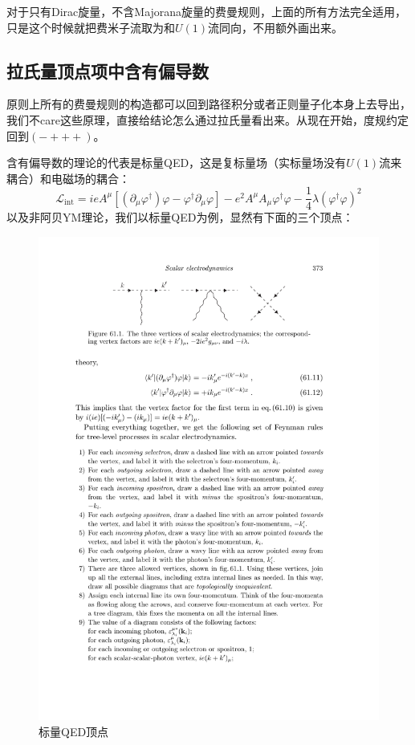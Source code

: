 对于只有Dirac旋量，不含Majorana旋量的费曼规则，上面的所有方法完全适用，只是这个时候就把费米子流取为和$U(1)$流同向，不用额外画出来。
\subsection{拉氏量顶点项中含有偏导数}
原则上所有的费曼规则的构造都可以回到路径积分或者正则量子化本身上去导出，我们不care这些原理，直接给结论怎么通过拉氏量看出来。从现在开始，度规约定回到$(-+++)$。

含有偏导数的理论的代表是标量QED，这是复标量场（实标量场没有$U(1)$流来耦合）和电磁场的耦合：
\begin{equation}
	\mathcal{L}_{\text{int}}=ieA^\mu[(\partial_\mu\varphi^\dagger)\varphi-\varphi^\dagger\partial_\mu\varphi]-e^2A^\mu A_\mu\varphi^\dagger\varphi-\frac14\lambda(\varphi^\dagger\varphi)^2
\end{equation}
以及非阿贝YM理论，我们以标量QED为例，显然有下面的三个顶点：
\begin{figure}[htbp]
	\centering
	\includegraphics{figs/fig27.pdf}
	\caption{标量QED顶点}
	\label{sqed}
\end{figure}
